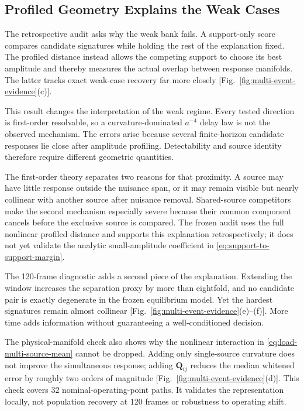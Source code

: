 \subsection{Profiled Geometry Explains the Weak Cases}

The retrospective audit asks why the weak bank fails. A support-only score compares candidate signatures while holding the rest of the explanation fixed. The profiled distance instead allows the competing support to choose its best amplitude and thereby measures the actual overlap between response manifolds. The latter tracks exact weak-case recovery far more closely [Fig.~\ref{fig:multi-event-evidence}(c)].

This result changes the interpretation of the weak regime. Every tested direction is first-order resolvable, so a curvature-dominated $a^{-4}$ delay law is not the observed mechanism. The errors arise because several finite-horizon candidate responses lie close after amplitude profiling. Detectability and source identity therefore require different geometric quantities.

The first-order theory separates two reasons for that proximity. A source may have
little response outside the nuisance span, or it may remain visible but nearly
collinear with another source after nuisance removal. Shared-source competitors
make the second mechanism especially severe because their common component
cancels before the exclusive source is compared. The frozen audit uses the full
nonlinear profiled distance and supports this explanation retrospectively; it does
not yet validate the analytic small-amplitude coefficient in
\eqref{eq:support-to-support-margin}.

The 120-frame diagnostic adds a second piece of the explanation. Extending the window increases the separation proxy by more than eightfold, and no candidate pair is exactly degenerate in the frozen equilibrium model. Yet the hardest signatures remain almost collinear [Fig.~\ref{fig:multi-event-evidence}(e)--(f)]. More time adds information without guaranteeing a well-conditioned decision.

The physical-manifold check also shows why the nonlinear interaction in \eqref{eq:load-multi-source-mean} cannot be dropped. Adding only single-source curvature does not improve the simultaneous response; adding $\bm Q_{ij}$ reduces the median whitened error by roughly two orders of magnitude [Fig.~\ref{fig:multi-event-evidence}(d)]. This check covers 32 nominal-operating-point paths. It validates the representation locally, not population recovery at 120 frames or robustness to operating shift.

